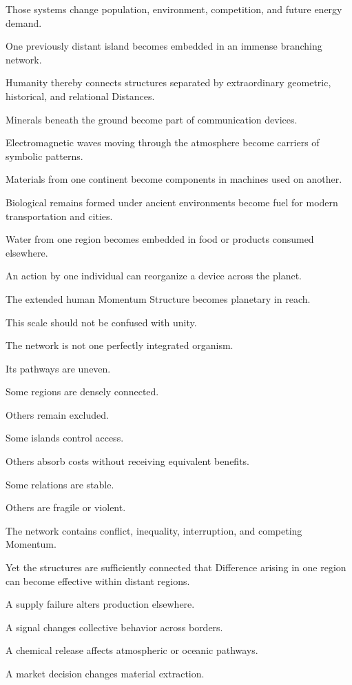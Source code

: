 Those systems change population, environment, competition, and future energy demand.

One previously distant island becomes embedded in an immense branching network.

Humanity thereby connects structures separated by extraordinary geometric, historical, and relational Distances.

Minerals beneath the ground become part of communication devices.

Electromagnetic waves moving through the atmosphere become carriers of symbolic patterns.

Materials from one continent become components in machines used on another.

Biological remains formed under ancient environments become fuel for modern transportation and cities.

Water from one region becomes embedded in food or products consumed elsewhere.

An action by one individual can reorganize a device across the planet.

The extended human Momentum Structure becomes planetary in reach.

This scale should not be confused with unity.

The network is not one perfectly integrated organism.

Its pathways are uneven.

Some regions are densely connected.

Others remain excluded.

Some islands control access.

Others absorb costs without receiving equivalent benefits.

Some relations are stable.

Others are fragile or violent.

The network contains conflict, inequality, interruption, and competing Momentum.

Yet the structures are sufficiently connected that Difference arising in one region can become effective within distant regions.

A supply failure alters production elsewhere.

A signal changes collective behavior across borders.

A chemical release affects atmospheric or oceanic pathways.

A market decision changes material extraction.

